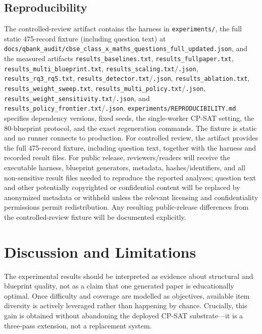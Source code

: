 \documentclass[runningheads]{llncs}
\begin{document}
\subsection{Reproducibility}
The controlled-review artifact contains the harness in \texttt{experiments/}, the full static 475-record fixture (including question text) at \texttt{docs/qbank\_audit/cbse\_class\_x\_maths\_questions\_full\_updated.json}, and the measured artifacts \texttt{results\_baselines.txt}, \texttt{results\_fullpaper.txt}, \texttt{results\_multi\_blueprint.txt}, \texttt{results\_scaling.txt}/\texttt{.json}, \texttt{results\_rq3\_rq5.txt}, \texttt{results\_detector.txt}/\texttt{.json}, \texttt{results\_ablation.txt}, \texttt{results\_weight\_sweep.txt}, \texttt{results\_multi\_policy.txt}/\texttt{.json}, \texttt{results\_weight\_sensitivity.txt}/\texttt{.json}, and \texttt{results\_policy\_frontier.txt}/\texttt{.json}.
\texttt{experiments/REPRODUCIBILITY.md} specifies dependency versions, fixed seeds, the single-worker CP-SAT setting, the 80-blueprint protocol, and the exact regeneration commands.
The fixture is static and no runner connects to production. For controlled review, the artifact provides the full 475-record fixture, including question text, together with the harness and recorded result files. For public release, reviewers/readers will receive the executable harness, blueprint generators, metadata, hashes/identifiers, and all non-sensitive result files needed to reproduce the reported analyses; question text and other potentially copyrighted or confidential content will be replaced by anonymized metadata or withheld unless the relevant licensing and confidentiality permissions permit redistribution. Any resulting public-release differences from the controlled-review fixture will be documented explicitly.

\section{Discussion and Limitations}
\label{sec:discussion}

The experimental results should be interpreted as evidence about structural and blueprint quality, not as a claim that one generated paper is educationally optimal.
Once difficulty and coverage are modelled as objectives, available item diversity is actively leveraged rather than happening by chance.
Crucially, this gain is obtained without abandoning the deployed CP-SAT substrate---it is a three-pass extension, not a replacement system.
\end{document}
